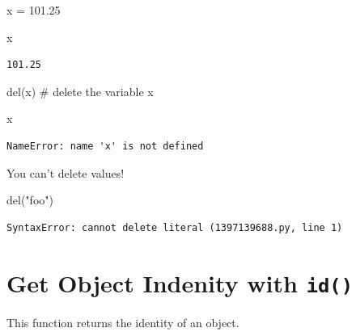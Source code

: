 \documentclass[
  letterpaper,
  DIV=11,
  numbers=noendperiod]{scrreprt}
\newenvironment{Shaded}{\begin{snugshade}}{\end{snugshade}}
\newcommand{\CommentTok}[1]{\textcolor[rgb]{0.37,0.37,0.37}{#1}}
\newcommand{\FloatTok}[1]{\textcolor[rgb]{0.68,0.00,0.00}{#1}}
\newcommand{\KeywordTok}[1]{\textcolor[rgb]{0.00,0.23,0.31}{#1}}
\newcommand{\NormalTok}[1]{\textcolor[rgb]{0.00,0.23,0.31}{#1}}
\newcommand{\OperatorTok}[1]{\textcolor[rgb]{0.37,0.37,0.37}{#1}}
\newcommand{\StringTok}[1]{\textcolor[rgb]{0.13,0.47,0.30}{#1}}
\begin{document}
\begin{Shaded}
\begin{Highlighting}[]
\NormalTok{x }\OperatorTok{=} \FloatTok{101.25}
\end{Highlighting}
\end{Shaded}

\begin{Shaded}
\begin{Highlighting}[]
\NormalTok{x}
\end{Highlighting}
\end{Shaded}

\begin{verbatim}
101.25
\end{verbatim}

\begin{Shaded}
\begin{Highlighting}[]
\KeywordTok{del}\NormalTok{(x)  }\CommentTok{\# delete the variable x}
\end{Highlighting}
\end{Shaded}

\begin{Shaded}
\begin{Highlighting}[]
\NormalTok{x}
\end{Highlighting}
\end{Shaded}

\begin{verbatim}
NameError: name 'x' is not defined
\end{verbatim}

You can't delete values!

\begin{Shaded}
\begin{Highlighting}[]
\KeywordTok{del}\NormalTok{(}\StringTok{"foo"}\NormalTok{)}
\end{Highlighting}
\end{Shaded}

\begin{verbatim}
SyntaxError: cannot delete literal (1397139688.py, line 1)
\end{verbatim}

\hypertarget{get-object-indenity-with-id}{%
\chapter{\texorpdfstring{Get Object Indenity with
\texttt{id()}}{Get Object Indenity with id()}}\label{get-object-indenity-with-id}}

This function returns the identity of an object.
\end{document}
